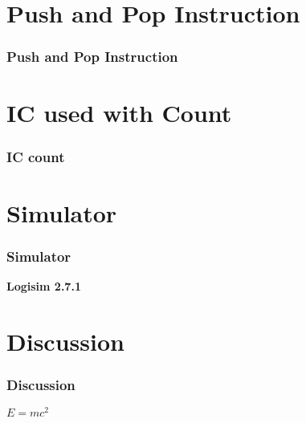 \documentclass[8pt, light]{oist_presentation}
\begin{document}
\section{Push and Pop Instruction}

\begin{frame}
\frametitle{Push and Pop Instruction}
\begin{table}
\end{table}
\end{frame}



\section{IC used with Count}
\begin{frame}
\frametitle{IC count}
\end{frame}

\section{Simulator}
\begin{frame}
\frametitle{Simulator}
\textbf{Logisim 2.7.1}
\end{frame}


\section{Discussion}
\begin{frame}
\frametitle{Discussion}
\begin{theorem}
$E = mc^2$
\end{theorem}
\end{frame}



\end{document}

